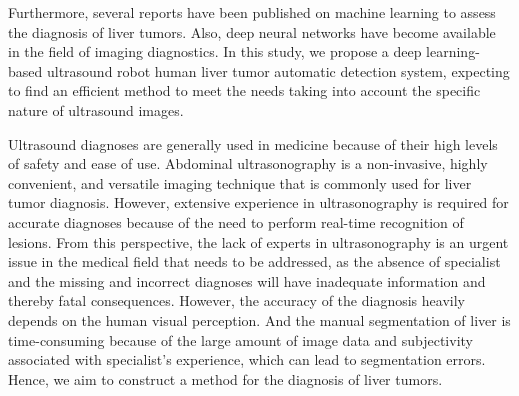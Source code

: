 \documentclass[a4paper]{article}
\begin{document}
Furthermore, several reports have been published on machine learning to assess the diagnosis of liver tumors. Also, deep neural networks have become available in the field of imaging diagnostics. In this study, we propose a deep learning-based ultrasound robot human liver tumor automatic detection system, expecting to find an efficient method to meet the needs taking into account the specific nature of ultrasound images.

Ultrasound diagnoses are generally used in medicine because of their high levels of safety and ease of use\cite{r8}. Abdominal ultrasonography is a non-invasive, highly convenient, and versatile imaging technique that is commonly used for liver tumor diagnosis. However, extensive experience in ultrasonography is required for accurate diagnoses because of the need to perform real-time recognition of lesions. From this perspective, the lack of experts in ultrasonography is an urgent issue in the medical field that needs to be addressed, as the absence of specialist and the missing and incorrect diagnoses will have inadequate information and thereby fatal consequences. However, the accuracy of the diagnosis heavily depends on the human visual perception. And the manual segmentation of liver is time-consuming because of the large amount of image data and subjectivity associated with specialist's experience, which can lead to segmentation errors. Hence, we aim to construct a method for the diagnosis of liver tumors.


\iffalse
\end{document}
